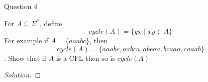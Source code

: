 \begin{solution}{Question 4}\label{ques:4}
    \begin{question}
    For $A \subseteq \Sigma^*$, define 
$$cycle(A) = \{yx \mid xy \in A\}$$
For example if $A = \{aaabc\}$, then 
$$cycle(A) = \{aaabc, aabca, abcaa, bcaaa, caaab\}$$.
Show that if $A$ is a CFL then so is $cycle(A)$
    \end{question}
    \tcblower{}
    \begin{proof}[Solution]
    \end{proof}
\end{solution}
